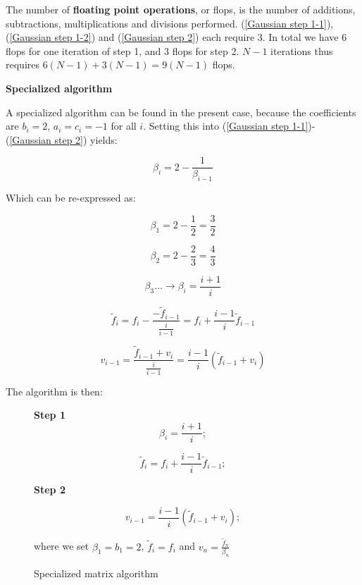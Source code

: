 \documentclass[11pt]{article}
\begin{document}
\begin{flushleft}
The number of \textbf{floating point operations}, or flops, is the number of additions, subtractions, multiplications and divisions performed. (\ref{Gaussian step 1-1}), (\ref{Gaussian step 1-2}) and (\ref{Gaussian step 2}) each require 3. In total we have $6$ flops for one iteration of step 1, and $3$ flops for step 2. $N-1$ iterations thus requires $6(N-1) + 3(N-1) = 9(N-1)$ flops.
\end{flushleft}


\begin{flushleft}

\textbf{Specialized algorithm}

A specialized algorithm can be found in the present case, because the coefficients are $b_i = 2$, $a_i = c_i = -1$ for all $i$. Setting this into (\ref{Gaussian step 1-1})-(\ref{Gaussian step 2}) yields:

$$
\beta_i = 2 - \frac{1}{\beta_{i-1}} 
$$

Which can be re-expressed as: 

$$
\beta_1 = 2 - \frac{1}{2} = \frac{3}{2}
$$

$$
\beta_2 = 2 - \frac{2}{3} = \frac{4}{3}
$$

$$
\beta_3 ... \rightarrow \beta_i = \frac{i+1}{i}
$$


$$
\tilde{f}_i = f_i - \frac{- \tilde{f}_{i-1}}{\frac{i}{i-1}} = f_i + \frac{i-1}{i} \tilde{f}_{i-1}
$$


$$
v_{i-1} = \frac{\tilde{f}_{i-1} + v_i}{\frac{i}{i-1}} = \frac{i-1}{i} (\tilde{f}_{i-1} + v_i)
$$

The algorithm is then:

\begin{figure}[ht]\label{Specialized algorithm}
\begin{framed}
\begin{minipage}[b]{0.45\linewidth}
\centering
\textbf{Step 1}
\begin{equation}\label{Specialized step 1-1}
\beta_i = \frac{i+1}{i};
\end{equation}

\begin{equation}\label{Specialized step 1-2}
\tilde{f}_i = f_i + \frac{i -1}{i}\tilde{f}_{i-1};
\end{equation}
\end{minipage}
\hspace{0.5cm}
\begin{minipage}[b]{0.45\linewidth}
\centering
\textbf{Step 2}

\begin{equation}\label{Specialized step 2}
v_{i-1} = \frac{i-1}{i} (\tilde{f}_{i-1} + v_i);
\end{equation}

where we set $\beta_1 = b_1 = 2$, $\tilde{f}_i = f_i$ and $v_n = \frac{\tilde{f}_n}{\beta_n}$
\end{minipage}
\end{framed}
\caption{Specialized matrix algorithm}
\end{figure}

\end{flushleft}
\end{document}
